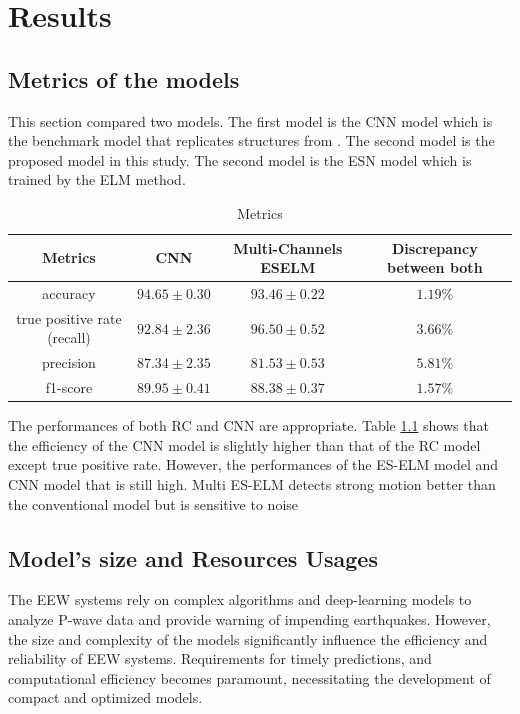 \chapter{Results}\label{chap:result}
\section{Metrics of the models}
This section compared two models. The first model is the CNN model which is the benchmark model that replicates structures from \cite{chiang2022neural}. The second model is the proposed model in this study.
The second model is the ESN model which is trained by the ELM method.
\begin{table}[ht]
\centering
\caption{Metrics}
\label{tab:metric}
\setlength{\tabcolsep}{3pt}
\begin{tabular}{|c|c|c|c|}
\hline
\textbf{Metrics}& \textbf{CNN}	& \textbf{Multi-Channels ESELM} & \textbf{Discrepancy between both} \\
\hline
accuracy	& $\pmb{94.65\pm 0.30}$		& $93.46\pm0.22$& $1.19\%$\\
true positive rate (recall)	& $92.84\pm 2.36$		& $\pmb{96.50\pm0.52}$& $3.66\%$\\
precision	& $\pmb{87.34\pm 2.35}$		& $81.53\pm0.53$& $5.81\%$\\
f1-score	& $\pmb{89.95\pm 0.41}$		& $88.38\pm0.37$& $1.57\%$\\
\hline
\end{tabular}
\end{table}

The performances of both RC and CNN are appropriate. Table \ref{tab:metric} shows that the efficiency of the CNN model is slightly higher than that of the RC model except true positive rate. However, the performances of the ES-ELM model and CNN model that is still high. Multi ES-ELM detects strong motion better than the conventional model but is sensitive to noise\\

\section{Model's size  and Resources Usages}

The EEW systems rely on complex algorithms and deep-learning models to analyze P-wave data and provide warning of impending earthquakes. However, the size and complexity of the models significantly influence the efficiency and reliability of EEW systems. Requirements for timely predictions, and computational efficiency becomes paramount, necessitating the development of compact and optimized models.

